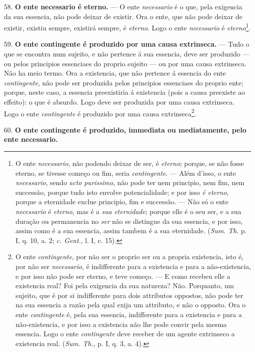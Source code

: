 58. \textbf{O ente necessario é eterno.} --- O ente \emph{necessario} é o que, pela exigencia da sua essencia, não pode deixar de existir. Ora o ente, que não pode deixar de existir, existiu sempre, existirá sempre, é \emph{eterno}. Logo o ente \emph{necessario} é \emph{eterno}\footnote{O ente \emph{necessario}, não podendo deixar de ser, é \emph{eterno}; porque, se não fosse eterno, se tivesse começo ou fim, seria \emph{contingente}. --- Além d'isso, o ente \emph{necessario}, sendo \emph{acto purissimo}, não pode ter nem principio, nem fim, nem successão, porque tudo isto envolve potencialidade; e por isso \emph{é eterno}, porque a eternidade exclue principio, fim e successão. --- Não só o ente \emph{necessario} é \emph{eterno}, mas é a \emph{sua eternidade}; porque elle é o seu ser, e a sua duração ou permanencia no \emph{ser} não se distingue da sua essencia, e por isso, assim como é a sua essencia, assim tambem é a sua eternidade. (\emph{Sum. Th.} p. I, q. 10, a. 2; \emph{c. Gent.}, l. I, c. 15).}.

59. \textbf{O ente contingente é produzido por uma causa extrinseca.} --- Tudo o que se encontra num sujeito, e não pertence á sua essencia, deve ser produzido --- ou pelos principios essenciaes do proprio sujeito --- ou por uma causa extrinseca. Não ha meio termo. Ora a existencia, que não pertence á essencia do ente \emph{contingente}, não pode ser produzida pelos principios essenciaes do proprio ente; porque, neste caso, a essencia preexistiria á existencia (pois a causa preexiste ao effeito): o que é absurdo. Logo deve ser produzida por uma causa extrinseca. Logo o ente \emph{contingente} é produzido por uma causa extrinseca\footnote{O ente \emph{contingente}, por não ser o proprio ser ou a propria existencia, isto é, por não ser \emph{necessario}, é indifferente para a existencia e para a não-existencia, e por isso não pode ser eterno, e teve começo. --- E como recebeu elle a existencia real? Foi pela exigencia da sua natureza? Não. Porquanto, um sujeito, que é por si indifferente para dois attributos oppostos, não pode ter na sua essencia a razão pela qual exija um attributo, e não o opposto. Ora o ente \emph{contingente} é, pela sua essencia, indifferente para a existencia e para a não-existencia, e por isso a existencia não lhe pode convir pela mesma essencia. Logo o ente \emph{contingente} deve receber de um agente extrinseco a existencia real. (\emph{Sum. Th.}, p. I, q. 3, a. 4).}.


60. \textbf{O ente contingente é produzido, immediata ou mediatamente, pelo ente necessario.}

